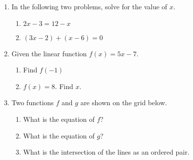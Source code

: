 \documentclass[12pt, twoside]{article}
\begin{document}
\begin{enumerate}
\newpage
\item In the following two problems, solve for the value of $x$.
  \begin{multicols}{2}
    \begin{enumerate}
      \item   $2x-3=12-x$ \vspace{6cm}
      \item   $(3x-2)+(x-6)=0$ \vspace{6cm}
    \end{enumerate}
  \end{multicols}
    \vspace{3cm}

\item Given the linear function $f(x)=5x-7$.
\begin{multicols}{2}
  \begin{enumerate}
    \item Find $f(-1)$ \vspace{6cm}
    \item   $f(x)=8$. Find $x$. \vspace{6cm}
  \end{enumerate}
\end{multicols}
  \vspace{6cm}

\item Two functions $f$ and $g$ are shown on the grid below.
\begin{multicols}{2}
\begin{enumerate}
  \item What is the equation of $f$?
  \item What is the equation of $g$?
  \vspace{0.25cm}
  \item What is the intersection of the lines as an ordered pair.
\end{enumerate}
\end{multicols}

\end{enumerate}
\end{document}
